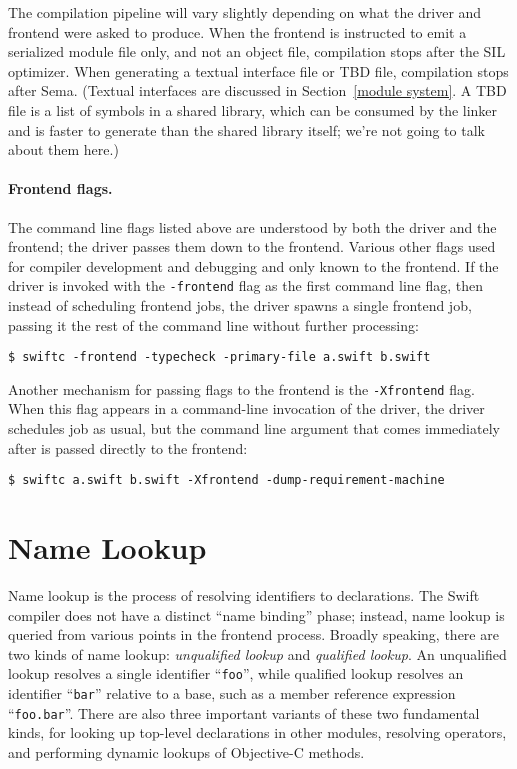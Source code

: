 \documentclass[../generics]{subfiles}
\begin{document}
The compilation pipeline will vary slightly depending on what the driver and frontend were asked to produce. When the frontend is instructed to emit a serialized module file only, and not an object file, compilation stops after the SIL optimizer. When generating a textual interface file or TBD file, compilation stops after Sema. (Textual interfaces are discussed in Section~\ref{module system}. A TBD file is a list of symbols in a shared library, which can be consumed by the linker and is faster to generate than the shared library itself; we're not going to talk about them here.)

\paragraph{Frontend flags.}
The command line flags listed above are understood by both the driver and the frontend; the driver passes them down to the frontend. Various other flags used for compiler development and debugging and only known to the frontend. If the driver is invoked with the \texttt{-frontend} flag as the first command line flag, then instead of scheduling frontend jobs, the driver spawns a single frontend job, passing it the rest of the command line without further processing:
\begin{Verbatim}
$ swiftc -frontend -typecheck -primary-file a.swift b.swift
\end{Verbatim}
Another mechanism for passing flags to the frontend is the \texttt{-Xfrontend} flag. When this flag appears in a command-line invocation of the driver, the driver schedules job as usual, but the command line argument that comes immediately after is passed directly to the frontend:
\begin{Verbatim}
$ swiftc a.swift b.swift -Xfrontend -dump-requirement-machine
\end{Verbatim}

\section{Name Lookup}\label{name lookup}

Name lookup is the process of resolving identifiers to declarations. The Swift compiler does not have a distinct ``name binding'' phase; instead, name lookup is queried from various points in the frontend process. Broadly speaking, there are two kinds of name lookup: \emph{unqualified lookup} and \emph{qualified lookup}. An unqualified lookup resolves a single identifier ``\texttt{foo}'', while qualified lookup resolves an identifier ``\texttt{bar}'' relative to a base, such as a member reference expression ``\texttt{foo.bar}''. There are also three important variants of these two fundamental kinds, for looking up top-level declarations in other modules, resolving operators, and performing dynamic lookups of Objective-C methods.
\end{document}
